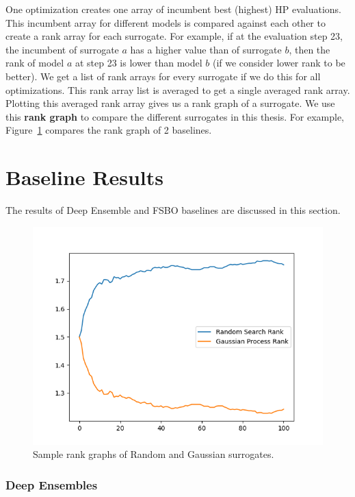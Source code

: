 \documentclass[12pt, twoside, ngerman]{report}
\begin{document}
One optimization creates one array of incumbent best (highest) HP evaluations.
This incumbent array for different models is compared against each other to create a rank array for each surrogate.
For example, if at the evaluation step 23, the incumbent of surrogate $a$ has a higher value than of surrogate $b$, then the rank of model $a$ at step 23 is lower than model $b$ (if we consider lower rank to be better).
We get a list of rank arrays for every surrogate if we do this for all optimizations.
This rank array list is averaged to get a single averaged rank array.
Plotting this averaged rank array gives us a rank graph of a surrogate.
We use this \textbf{rank graph} to compare the different surrogates in this thesis.
For example, Figure~\ref{fig:RsGpRankGraph} compares the rank graph of 2 baselines.

\section{Baseline Results}
\label{sec:baselineResults}
The results of Deep Ensemble and FSBO baselines are discussed in this section.

\begin{figure}[htb]
  \centering
    \includegraphics[scale=0.5]{images/RsGpRankGraph}
    \caption{Sample rank graphs of Random and Gaussian surrogates.}
    \label{fig:RsGpRankGraph}
\end{figure}

\subsubsection{Deep Ensembles}
\end{document}
